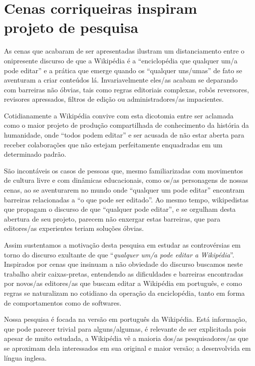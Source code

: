 \section{Cenas corriqueiras inspiram projeto de pesquisa}

As cenas que acabaram de ser apresentadas ilustram um distanciamento entre o onipresente discurso de que a Wikipédia é a ``enciclopédia que qualquer um/a pode editar'' e a prática que emerge quando os ``qualquer uns/umas'' de fato se aventuram a criar conteúdos lá. Invariavelmente eles/as acabam se deparando com barreiras não óbvias, tais como regras editoriais complexas, robôs reversores, revisores apressados, filtros de edição ou administradores/as impacientes.

Cotidianamente a Wikipédia convive com esta dicotomia entre ser aclamada como o maior projeto de produção compartilhada de conhecimento da história da humanidade, onde ``todos podem editar'' e ser acusada de não estar aberta para receber colaborações que não estejam perfeitamente enquadradas em um determinado padrão.

São incontáveis os casos de pessoas que, mesmo familiarizadas com movimentos de cultura livre e com dinâmicas educacionais, como os/as personagens de nossas cenas, ao se aventurarem no mundo onde ``qualquer um pode editar'' encontram barreiras relacionadas a ``o que pode ser editado''. Ao mesmo tempo, wikipedistas que propagam o discurso de que ``qualquer pode editar'', e se orgulham desta abertura de seu projeto, parecem não enxergar estas barreiras, que para editores/as experientes teriam soluções óbvias.

Assim sustentamos a motivação desta pesquisa em estudar as controvérsias em torno do discurso exultante de que ``\textit{qualquer um/a pode editar a Wikipédia}''. Inspirados por cenas que insinuam a não obviedade do discurso buscamos neste trabalho abrir caixas-pretas, entendendo as dificuldades e barreiras encontradas por novos/as editores/as que buscam editar a Wikipédia em português, e como regras se naturalizam no cotidiano da operação da enciclopédia, tanto em forma de comportamentos como de softwares.

Nossa pesquisa é focada na versão em português da Wikipédia. Está informação, que pode parecer trivial para alguns/algumas, é relevante de ser explicitada pois apesar de muito estudada, a Wikipédia vê a maioria dos/as pesquisadores/as que se aproximam dela interessados em sua original e maior versão; a desenvolvida em língua inglesa. 

